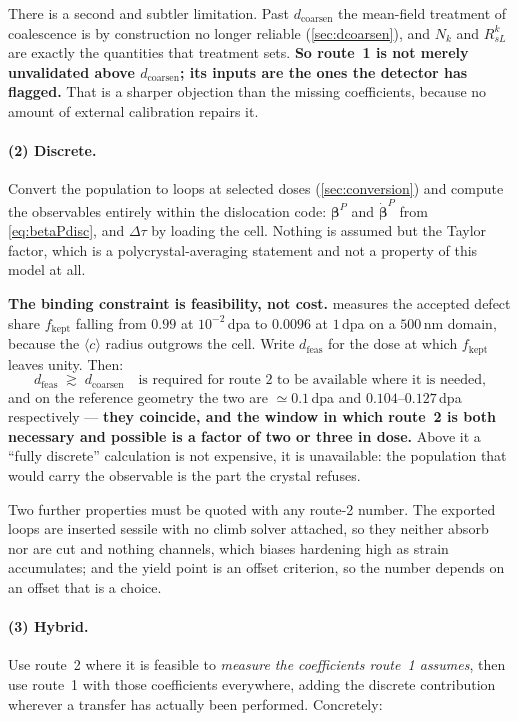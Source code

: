 \documentclass{article}
\newcommand{\cloop}{\ensuremath{\langle c\rangle}}
\begin{document}
There is a second and subtler limitation. Past $d_{\mathrm{coarsen}}$ the
mean-field treatment of coalescence is by construction no longer reliable
(\cref{sec:dcoarsen}), and $N_k$ and $R^k_{sL}$ are exactly the quantities that
treatment sets. \textbf{So route~1 is not merely unvalidated above
$d_{\mathrm{coarsen}}$; its inputs are the ones the detector has flagged.} That
is a sharper objection than the missing coefficients, because no amount of
external calibration repairs it.

\paragraph{(2) Discrete.} Convert the population to loops at selected doses
(\cref{sec:conversion}) and compute the observables entirely within the
dislocation code: $\bm\beta^{P}$ and $\dot{\bm\beta}^{P}$ from
\cref{eq:betaPdisc}, and $\Delta\tau$ by loading the cell. Nothing is assumed but
the Taylor factor, which is a polycrystal-averaging statement and not a property
of this model at all.

\textbf{The binding constraint is feasibility, not cost.} 
measures the accepted defect share $f_{\mathrm{kept}}$ falling from $0.99$ at
$10^{-2}\,$dpa to $0.0096$ at $1\,$dpa on a $500\,$nm domain, because the
\cloop{} radius outgrows the cell. Write $d_{\mathrm{feas}}$ for the dose at
which $f_{\mathrm{kept}}$ leaves unity. Then:
\begin{equation}
  d_{\mathrm{feas}}\;\gtrsim\;d_{\mathrm{coarsen}}
  \quad\text{is required for route 2 to be available where it is needed,}
  \label{eq:feaswindow}
\end{equation}
and on the reference geometry the two are $\simeq0.1\,$dpa and $0.104$--$0.127\,$dpa
respectively --- \textbf{they coincide, and the window in which route~2 is both
necessary and possible is a factor of two or three in dose.} Above it a ``fully
discrete'' calculation is not expensive, it is unavailable: the population that
would carry the observable is the part the crystal refuses.

Two further properties must be quoted with any route-2 number. The exported
loops are inserted sessile with no climb solver attached, so they neither absorb
nor are cut and nothing channels, which biases hardening high as strain
accumulates; and the yield point is an offset criterion, so the number depends on
an offset that is a choice.

\paragraph{(3) Hybrid.} Use route~2 where it is feasible to \emph{measure the
coefficients route~1 assumes}, then use route~1 with those coefficients
everywhere, adding the discrete contribution wherever a transfer has actually
been performed. Concretely:
\end{document}
